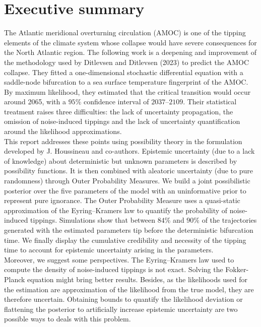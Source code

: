 \documentclass[12pt,a4paper]{article}
\theoremstyle{definition}
\theoremstyle{plain}
\begin{document}


\newpage
\thispagestyle{plain}
\section*{Executive summary}


\noindent
The Atlantic meridional overturning circulation (AMOC) is one of the tipping elements of the
climate system whose collapse would have severe consequences for the North Atlantic region.
The following work is a deepening and improvement of the methodology used by Ditlevsen and Ditlevsen (2023) \cite{ditlevsen2023} to predict the AMOC collapse. They fitted a one-dimensional
stochastic differential equation with a saddle-node bifurcation to a sea surface temperature
fingerprint of the AMOC. By maximum likelihood, they estimated that the critical transition
would occur around 2065, with a $95\%$ confidence interval of $2037$--$2109$. Their statistical
treatment raises three difficulties: the lack of uncertainty propagation, the omission of noise-induced tippings and the lack of uncertainty quantification around the likelihood approximations. \\

\noindent
This report addresses these points using possibility theory in the formulation developed by
J. Houssineau and co-authors. Epistemic uncertainty (due to a lack of knowledge) about deterministic but unknown
parameters is described by possibility functions. It is then combined
with aleatoric uncertainty (due to pure randomness) through Outer Probability Measures. We build a joint possibilistic
posterior over the five parameters of the model with an uninformative prior to represent pure ignorance. The Outer Probability Measure uses a quasi-static approximation of the Eyring--Kramers law to quantify the probability of noise-induced tippings. Simulations show that between
$84\%$ and $90\%$ of the trajectories generated with the estimated parameters tip before the deterministic bifurcation time. We finally display the cumulative credibility and necessity of the tipping time to account for epistemic uncertainty arising in the parameters. \\

\noindent Moreover, we suggest some perspectives. The Eyring--Kramers law used to compute the density of noise-induced tippings is not exact. Solving the Fokker-Planck equation might bring better results. Besides, as the likelihoods used for the estimation are approximation of the likelihood from the true model, they are therefore uncertain. Obtaining bounds to quantify the likelihood deviation or flattening the posterior to artificially increase epistemic uncertainty are two possible ways to deals with this problem. \\
\end{document}
